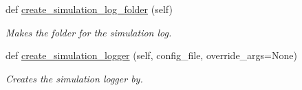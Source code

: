 \begin{DoxyCompactItemize}
\mbox{\label{class_build_1_1_simulation___operation_1_1logger_1_1_simulation_logger_a9aff48a11c74720cea423a8183896b7d}} 
def \hyperlink{class_build_1_1_simulation___operation_1_1logger_1_1_simulation_logger_a9aff48a11c74720cea423a8183896b7d}{create\+\_\+simulation\+\_\+log\+\_\+folder} (self)
\begin{DoxyCompactList}\small\item\em Makes the folder for the simulation log. \end{DoxyCompactList}\item 
def \hyperlink{class_build_1_1_simulation___operation_1_1logger_1_1_simulation_logger_ae86da1b584efaa040ea62d793fe47c55}{create\+\_\+simulation\+\_\+logger} (self, config\+\_\+file, override\+\_\+args=None)
\begin{DoxyCompactList}\small\item\em Creates the simulation logger by. \end{DoxyCompactList}\end{DoxyCompactItemize}

